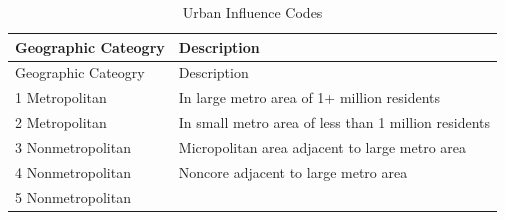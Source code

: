 \documentclass[10pt,]{article}
\begin{document}
\begin{longtable}[]{@{}ll@{}}
\caption{Urban Influence Codes}\tabularnewline
\toprule
\begin{minipage}[b]{0.16\columnwidth}\raggedright
Geographic Cateogry\strut
\end{minipage} & \begin{minipage}[b]{0.78\columnwidth}\raggedright
Description\strut
\end{minipage}\tabularnewline
\midrule
\endfirsthead
\toprule
\begin{minipage}[b]{0.16\columnwidth}\raggedright
Geographic Cateogry\strut
\end{minipage} & \begin{minipage}[b]{0.78\columnwidth}\raggedright
Description\strut
\end{minipage}\tabularnewline
\midrule
\endhead
\begin{minipage}[t]{0.16\columnwidth}\raggedright
1 Metropolitan\strut
\end{minipage} & \begin{minipage}[t]{0.78\columnwidth}\raggedright
In large metro area of 1+ million residents\strut
\end{minipage}\tabularnewline
\begin{minipage}[t]{0.16\columnwidth}\raggedright
2 Metropolitan\strut
\end{minipage} & \begin{minipage}[t]{0.78\columnwidth}\raggedright
In small metro area of less than 1 million residents\strut
\end{minipage}\tabularnewline
\begin{minipage}[t]{0.16\columnwidth}\raggedright
3 Nonmetropolitan\strut
\end{minipage} & \begin{minipage}[t]{0.78\columnwidth}\raggedright
Micropolitan area adjacent to large metro area\strut
\end{minipage}\tabularnewline
\begin{minipage}[t]{0.16\columnwidth}\raggedright
4 Nonmetropolitan\strut
\end{minipage} & \begin{minipage}[t]{0.78\columnwidth}\raggedright
Noncore adjacent to large metro area\strut
\end{minipage}\tabularnewline
\begin{minipage}[t]{0.16\columnwidth}\raggedright
5 Nonmetropolitan\strut
\end{minipage} & \begin{minipage}[t]{0.78\columnwidth}\raggedright

\end{minipage}
\end{longtable}
\end{document}
